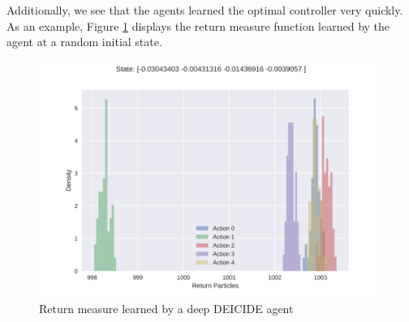 Additionally, we see that the agents learned the optimal controller
very quickly. As an example, Figure
\ref{fig:exp:cartpole:returnmeasure} displays the return measure
function learned by the agent at a random initial state.

\begin{figure}[h]
  \centering
  \includegraphics[scale=0.4]{results/ct51-fd-cartpole-returns}
  \caption{Return measure learned by a deep DEICIDE agent}
  \label{fig:exp:cartpole:returnmeasure}
\end{figure}
